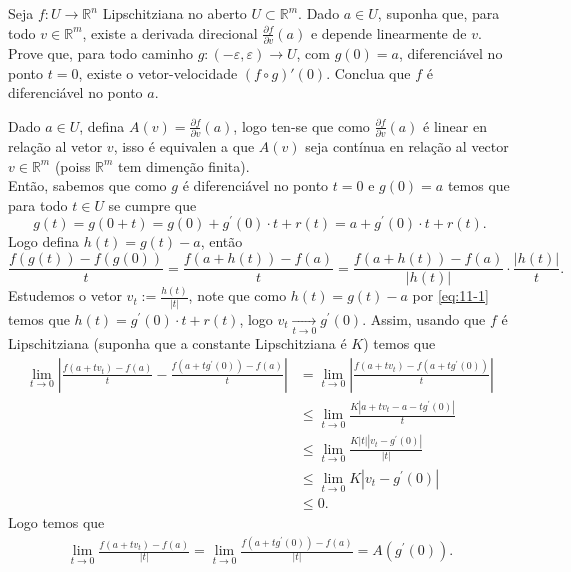 \begin{homeworkProblem}[Seção 2-2]
  Seja $f : U \to \mathbb{R}^n$ Lipschitziana no aberto $U \subset \mathbb{R}^m$. Dado $a \in U$, suponha que, para todo $v \in \mathbb{R}^m$, existe a derivada direcional $\frac{\partial f}{\partial v}(a)$ e depende linearmente de $v$. Prove que, para todo caminho $g : (-\varepsilon, \varepsilon) \to U$, com $g(0) = a$, diferenciável no ponto $t = 0$, existe o vetor-velocidade $(f \circ g)'(0)$. Conclua que $f$ é diferenciável no ponto $a$.
  \begin{solution}
    Dado $a\in U$, defina $A(v)=\frac{\partial f}{\partial v}(a)$, logo ten-se que como $\frac{\partial f}{\partial v}(a)$ é linear en relação al vetor $v$, isso é equivalen a que $A(v)$ seja contínua en relação al vector $v\in\mathbb{R}^{m}$ (poiss $\mathbb{R}^{m}$ tem dimenção finita).\\
    Então, sabemos que como $g$ é diferenciável no ponto $t=0$ e $g(0)=a$ temos que para todo $t\in U$ se cumpre que 
    \begin{equation}\label{eq:11-1}
      g(t)=g(0+t)=g(0)+g^{\prime}(0)\cdot t+r(t)=a+g^{\prime}(0)\cdot t+r(t).
    \end{equation}
    Logo defina $h(t)=g(t)-a$, então
    \begin{equation}\label{eq:11-2}
      \frac{f(g(t))-f(g(0))}{t}=\frac{f(a+h(t))-f(a)}{t}=\frac{f(a+h(t))-f(a)}{|h(t)|}\cdot\frac{|h(t)|}{t}.
    \end{equation}
    Estudemos o vetor $v_t:=\frac{h(t)}{|t|}$, note que como $h(t)=g(t)-a$ por \eqref{eq:11-1} temos que $h(t)=g^{\prime}(0)\cdot t+r(t)$, logo $v_t\xrightarrow[t\to 0]{}g^{\prime}(0)$. Assim, usando que $f$ é Lipschitziana (suponha que a constante Lipschitziana é $K$) temos que 
    \begin{align*}
      \lim_{t \to 0}\left| \frac{f(a+tv_t)-f(a)}{t} - \frac{f(a+tg^{\prime}(0))-f(a)}{t}\right|&= \lim_{t \to 0}\left| \frac{f(a+tv_t)-f(a+tg^{\prime}(0))}{t} \right|\\
      &\leq \lim_{t \to 0}\frac{K|a+tv_t-a-tg^{\prime}(0)|}{t}\\
      &\leq \lim_{t \to 0}\frac{K|t||v_t-g^{\prime}(0)|}{|t|}\\
      &\leq \lim_{t \to 0}K|v_t-g^{\prime}(0)|\\
      &\leq 0.
    \end{align*}
    Logo temos que
    \begin{align*}
      \lim_{t \to 0}\frac{f(a+tv_t)-f(a)}{|t|}=\lim_{t \to 0}\frac{f(a+tg^{\prime}(0))-f(a)}{|t|}=A(g^{\prime}(0)).

\end{align*}
\end{solution}
\end{homeworkProblem}
